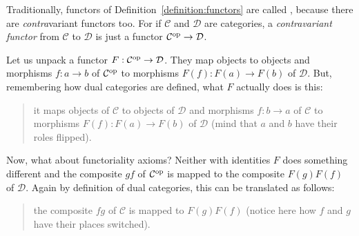 Traditionally, functors of Definition~\ref{definition:functors} are
called , because there are {\em contra}variant functors
too. For if \(\mathcal{C}\) and \(\mathcal{D}\) are categories, a {\em
  contravariant functor} from \(\mathcal{C}\) to \(\mathcal{D}\) is just a functor
\(\mathcal{C}^\text{op} \to \mathcal{D}\).

Let us unpack a functor \(F : \mathcal{C}^\text{op} \to \mathcal{D}\). They map objects
to objects and morphisms \(f : a \to b\) of \(\mathcal{C}^\text{op}\) to morphisms
\(F(f) : F(a) \to F(b)\) of \(\mathcal{D}\). But, remembering how dual
categories are defined, what \(F\) actually does is this:
\begin{quotation}
  it maps objects of \(\mathcal{C}\) to objects of \(\mathcal{D}\) and morphisms
  \(f : b \to a\) of \(\mathcal{C}\) to morphisms \(F(f) : F(a) \to F(b)\) of
  \(\mathcal{D}\) (mind that \(a\) and \(b\) have their roles flipped).
\end{quotation}
Now, what about functoriality axioms? Neither with identities \(F\) does
something different and the composite \(gf\) of \(\mathcal{C}^\text{op}\) is
mapped to the composite \(F(g)F(f)\) of \(\mathcal{D}\). Again by definition
of dual categories, this can be translated as follows:
\begin{quotation}
  the composite \(fg\) of \(\mathcal{C}\) is mapped to \(F(g)F(f)\) (notice
  here how \(f\) and \(g\) have their places switched).
\end{quotation}



